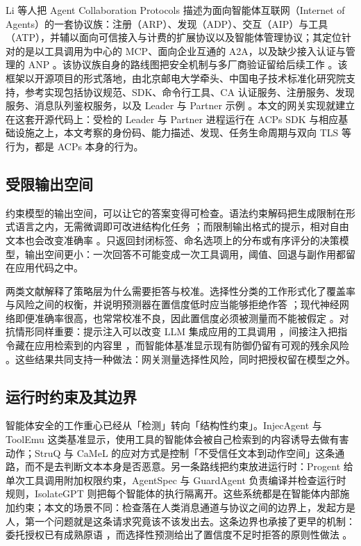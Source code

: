 \documentclass[11pt,a4paper]{article}
\begin{document}
Li 等人把 Agent Collaboration Protocols 描述为面向智能体互联网（Internet of Agents）的一套协议族：注册（ARP）、发现（ADP）、交互（AIP）与工具（ATP），并辅以面向可信接入与计费的扩展协议以及智能体管理协议；其定位针对的是以工具调用为中心的 MCP、面向企业互通的 A2A，以及缺少接入认证与管理的 ANP \cite{li2025acps,liu2025acps}。该协议族自身的路线图把安全机制与多厂商验证留给后续工作 \cite{liu2025acps}。该框架以开源项目的形式落地，由北京邮电大学牵头、中国电子技术标准化研究院支持，参考实现包括协议规范、SDK、命令行工具、CA 认证服务、注册服务、发现服务、消息队列鉴权服务，以及 Leader 与 Partner 示例 \cite{acps2026repo}。本文的网关实现就建立在这套开源代码上：受检的 Leader 与 Partner 进程运行在 ACPs SDK 与相应基础设施之上，本文考察的身份码、能力描述、发现、任务生命周期与双向 TLS 等行为，都是 ACPs 本身的行为。

\subsection{受限输出空间}

约束模型的输出空间，可以让它的答案变得可检查。语法约束解码把生成限制在形式语言之内，无需微调即可改进结构化任务 \cite{geng2023grammar}；而限制输出格式的提示，相对自由文本也会改变准确率 \cite{tam2024format}。只返回封闭标签、命名选项上的分布或有序评分的决策模型，输出空间更小：一次回答不可能变成一次工具调用，阈值、回退与副作用都留在应用代码之中。

两类文献解释了策略层为什么需要拒答与校准。选择性分类的工作形式化了覆盖率与风险之间的权衡，并说明预测器在置信度低时应当能够拒绝作答 \cite{geifman2017selective}；现代神经网络即便准确率很高，也常常校准不良，因此置信度必须被测量而不能被假定 \cite{guo2017calibration}。对抗情形同样重要：提示注入可以改变 LLM 集成应用的工具调用 \cite{greshake2023indirect}，间接注入把指令藏在应用检索到的内容里 \cite{liu2024promptinjection}，而智能体基准显示现有防御仍留有可观的残余风险 \cite{debenedetti2024agentdojo}。这些结果共同支持一种做法：网关测量选择性风险，同时把授权留在模型之外。

\subsection{运行时约束及其边界}

智能体安全的工作重心已经从「检测」转向「结构性约束」。InjecAgent \cite{injecagent2024} 与 ToolEmu \cite{toolemu2023} 这类基准显示，使用工具的智能体会被自己检索到的内容诱导去做有害动作；StruQ \cite{struq2024} 与 CaMeL \cite{camel2025} 的应对方式是控制「不受信任文本到动作空间」这条通路，而不是去判断文本本身是否恶意。另一条路线把约束放进运行时：Progent \cite{progent2025} 给单次工具调用附加权限约束，AgentSpec \cite{agentspec2025} 与 GuardAgent \cite{guardagent2024} 负责编译并检查运行时规则，IsolateGPT \cite{isolategpt2024} 则把每个智能体的执行隔离开。这些系统都是在智能体内部施加约束；本文的场景不同：检查落在人类消息通道与协议之间的边界上，发起方是人，第一个问题就是这条请求究竟该不该发出去。这条边界也承接了更早的机制：委托授权已有成熟原语 \cite{oauth2012}，而选择性预测给出了置信度不足时拒答的原则性做法 \cite{conformal2021,geifman2017selective}。
\end{document}
